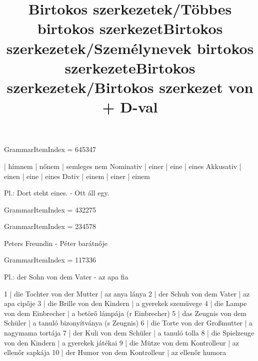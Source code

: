 GrammarItemIndex = 645347

\begin{desc}
          | hímnem | nőnem | semleges nem 
Nominativ | einer  | eine  | eines 
Akkusativ | einen  | eine  | eines 
Dativ     | einem  | einer | einem 

Pl.: Dort steht eines. - Ott áll egy.
\end{desc}

\begin{exmp}
\end{exmp}

\title{Birtokos szerkezetek/Többes birtokos szerkezet}

GrammarItemIndex = 432275

\begin{desc}
\end{desc}

\begin{exmp}
\end{exmp}

\title{Birtokos szerkezetek/Személynevek birtokos szerkezete}

GrammarItemIndex = 234578

\begin{desc}
Peters Freundin - Péter barátnője
\end{desc}

\begin{exmp}
\end{exmp}

\title{Birtokos szerkezetek/Birtokos szerkezet von + D-val}

GrammarItemIndex = 117336

\begin{desc}
Pl.: der Sohn von dem Vater - az apa fia
\end{desc}

\begin{exmp}
1 | die Tochter von der Mutter | az anya lánya
2 | der Schuh von dem Vater | az apa cipője
3 | die Brille von den Kindern | a gyerekek szemüvege
4 | die Lampe von dem Einbrecher | a betörő lámpája (r Einbrecher)
5 | das Zeugnis von dem Schüler | a tanuló bizonyítványa (s Zeugnis)
6 | die Torte von der Großmutter | a nagymama tortája
7 | der Kuli von dem Schüler | a tanuló tolla
8 | die Spielzeuge von den Kindern | a gyerekek játékai
9 | die Mütze von dem Kontrolleur | az ellenőr sapkája
10 | der Humor von dem Kontrolleur | az ellenőr humora
\end{exmp}

